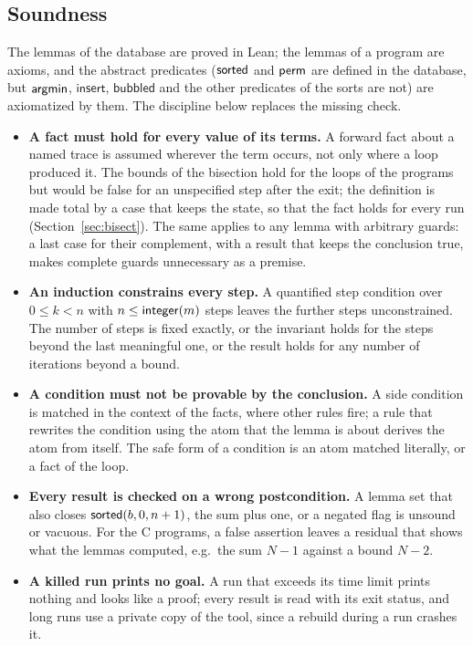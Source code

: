 \subsection{Soundness}\label{sec:principles:sound}
The lemmas of the database are proved in Lean; the lemmas of a program are axioms, and the abstract predicates
($\mathsf{sorted}$ and $\mathsf{perm}$ are defined in the database, but $\mathsf{argmin}$, $\mathsf{insert}$, $\mathsf{bubbled}$ and the other
predicates of the sorts are not) are axiomatized by them. The discipline below replaces the missing check.
\begin{itemize}[nosep]
\item \textbf{A fact must hold for every value of its terms.} A forward fact about a named trace is assumed wherever
  the term occurs, not only where a loop produced it. The bounds of the bisection hold for the loops of the programs
  but would be false for an unspecified step after the exit; the definition is made total by a case that keeps the
  state, so that the fact holds for every run (Section~\ref{sec:bisect}). The same applies to any lemma with arbitrary
  guards: a last case for their complement, with a result that keeps the conclusion true, makes complete guards
  unnecessary as a premise.
\item \textbf{An induction constrains every step.} A quantified step condition over $0 \le k < n$ with $n \le \mathsf{integer}(m)$
  steps leaves the further steps unconstrained. The number of steps is fixed exactly, or the invariant holds for the
  steps beyond the last meaningful one, or the result holds for any number of iterations beyond a bound.
\item \textbf{A condition must not be provable by the conclusion.} A side condition is matched in the context of the
  facts, where other rules fire; a rule that rewrites the condition using the atom that the lemma is about derives the
  atom from itself. The safe form of a condition is an atom matched literally, or a fact of the loop.
\item \textbf{Every result is checked on a wrong postcondition.} A lemma set that also closes $\mathsf{sorted}(b, 0, n + 1)$, the
  sum plus one, or a negated flag is unsound or vacuous. For the C programs, a false assertion leaves a residual that
  shows what the lemmas computed, e.g.\ the sum $N - 1$ against a bound $N - 2$.
\item \textbf{A killed run prints no goal.} A run that exceeds its time limit prints nothing and looks like a proof;
  every result is read with its exit status, and long runs use a private copy of the tool, since a rebuild during a run
  crashes it.
\end{itemize}

